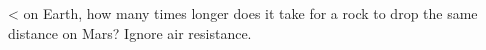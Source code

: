  <%
on Earth, how many times longer does it take for a rock to
drop the same distance on Mars?  Ignore air resistance.
